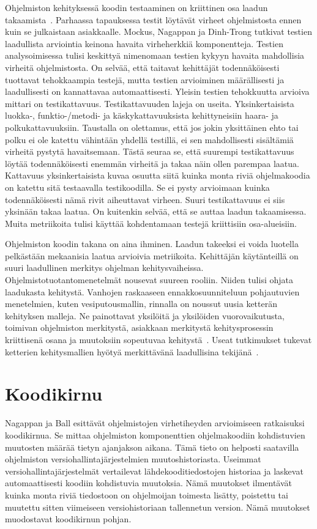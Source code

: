 \documentclass[finnish]{../tktltiki2}
\theoremstyle{definition}
\theoremstyle{remark}
\begin{document}
    Ohjelmiston kehityksessä koodin testaaminen on kriittinen osa laadun takaamista~\cite{MND09}. Parhaassa tapauksessa 
testit löytävät virheet ohjelmistosta ennen kuin se julkaistaan asiakkaalle. Mockus, Nagappan ja Dinh-Trong tutkivat 
testien laadullista arviointia keinona havaita virheherkkiä komponentteja. Testien analysoimisessa tulisi keskittyä 
nimenomaan testien kykyyn havaita mahdollisia virheitä ohjelmistosta. On selvää, että taitavat kehittäjät 
todennäköisesti tuottavat tehokkaampia testejä, mutta testien arvioiminen määrällisesti ja laadullisesti on kannattavaa 
automaattisesti. Yleisin testien tehokkuutta arvioiva mittari on testikattavuus. Testikattavuuden lajeja on useita. 
Yksinkertaisista luokka-, funktio-/metodi- ja käskykattavuuksista kehittyneisiin haara- ja polkukattavuuksiin. Taustalla 
on olettamus, että jos jokin yksittäinen ehto tai polku ei ole katettu vähintään yhdellä testillä, ei sen mahdollisesti 
sisältämiä virheitä pystytä havaitsemaan. Tästä seuraa se, että suurempi testikattavuus löytää todennäköisesti 
enemmän virheitä ja takaa näin ollen parempaa laatua. Kattavuus yksinkertaisista kuvaa osuutta siitä kuinka monta riviä 
ohjelmakoodia on katettu sitä testaavalla testikoodilla. Se ei pysty arvioimaan kuinka todennäköisesti nämä rivit 
aiheuttavat virheen. Suuri testikattavuus ei siis yksinään takaa laatua. On kuitenkin selvää, että se auttaa laadun 
takaamisessa. Muita metriikoita tulisi käyttää kohdentamaan testejä kriittisiin osa-alueisiin.

    Ohjelmiston koodin takana on aina ihminen.  Laadun takeeksi ei voida luotella pelkästään mekaanisia laatua arvioivia 
metriikoita. Kehittäjän käytänteillä on suuri laadullinen merkitys ohjelman kehitysvaiheissa. 
Ohjelmistotuotantomenetelmät nousevat suureen rooliin. Niiden tulisi ohjata laadukasta kehitystä. Vanhojen raskaaseen 
ennakkosuunniteluun pohjautuvien menetelmien, kuten vesiputousmallin, rinnalla on noussut uusia ketterän kehityksen 
malleja. Ne painottavat yksilöitä ja yksilöiden vuorovaikutusta, toimivan ohjelmiston merkitystä, asiakkaan merkitystä 
kehitysprosessin kriittisenä osana ja muutoksiin sopeutuvaa kehitystä~\cite{BBB00}. Useat tutkimukset tukevat ketterien 
kehitysmallien hyötyä merkittävänä laadullisina tekijänä~\cite{SS10}. 

\section{Koodikirnu}

Nagappan ja Ball esittävät ohjelmistojen virhetiheyden arvioimiseen ratkaisuksi koodikirnua. Se mittaa ohjelmiston 
komponenttien ohjelmakoodiin kohdistuvien muutosten määrää tietyn ajanjakson aikana. Tämä tieto on helposti saatavilla 
ohjelmiston versiohallintajärjestelmien muutoshistoriasta. Useimmat versiohallintajärjestelmät vertailevat 
lähdekooditiedostojen historiaa ja laskevat automaattisesti koodiin kohdistuvia muutoksia. Nämä muutokset ilmentävät 
kuinka monta riviä tiedostoon on ohjelmoijan toimesta lisätty, poistettu tai muutettu sitten viimeiseen versiohistoriaan 
tallennetun version. Nämä muutokset muodostavat koodikirnun pohjan.
\end{document}

